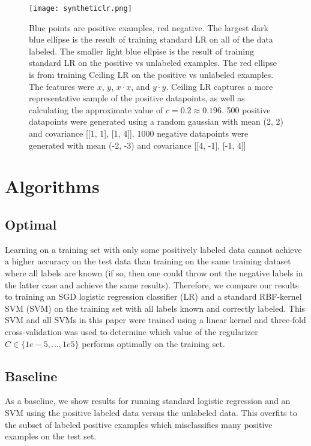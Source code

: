 \documentclass{article}
\begin{document}
\begin{figure*}[ht!]
\vskip 0.2in
\begin{center}
\centerline{\texttt{[image: syntheticlr.png]}}
\caption{Blue points are positive examples, red negative. The largest dark blue ellipse is the result of training standard LR on all of the data labeled. The smaller light blue ellpise is the result of training standard LR on the positive vs unlabeled examples. The red ellipse is from training Ceiling LR on the positive vs unlabeled examples. The features were $x$, $y$, $x \cdot x$, and $y \cdot y$.  Ceiling LR captures a more representative sample of the positive datapoints, as well as calculating the approximate value of $c = 0.2 \approx 0.196$.   500 positive datapoints were generated using a random gaussian with mean (2, 2) and covariance [[1, 1], [1, 4]].  1000 negative datapoints were generated with mean (-2, -3) and covariance [[4, -1], [-1, 4]]}
\label{synthetic}
\end{center}
\vskip -0.2in
\end{figure*}

\section{Algorithms}

\subsection{Optimal}

Learning on a training set with only some positively labeled data cannot achieve a higher accuracy on the test data than training on the same training dataset where all labels are known (if so, then one could throw out the negative labels in the latter case and achieve the same results).  Therefore, we compare our results to training an SGD logistic regression classifier (LR) and a standard RBF-kernel SVM (SVM) on the training set with all labels known and correctly labeled.  This SVM and all SVMs in this paper were trained using a linear kernel and three-fold cross-validation was used to determine which value of the regularizer $C \in \{1e-5, ..., 1e5\}$ performs optimally on the training set.

\subsection{Baseline}

As a baseline, we show results for running standard logistic regression and an SVM using the positive labeled data versus the unlabeled data.  This overfits to the subset of labeled positive examples which misclassifies many positive examples on the test set.
\end{document}
